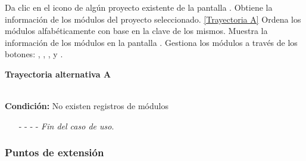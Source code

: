 \begin{UCtrayectoria}
	\UCpaso[\UCactor] Da clic en el icono  de algún proyecto existente de la pantalla .
	\UCpaso[\UCsist] Obtiene la información de los módulos del proyecto seleccionado. \hyperlink{CU5:TAA}{[Trayectoria A]}
	\UCpaso[\UCsist] Ordena los módulos alfabéticamente con base en la clave de los mismos.
	\UCpaso[\UCsist] Muestra la información de los módulos en la pantalla .\label{CU5-P3}
	\UCpaso[\UCactor] Gestiona los módulos a través de los botones: , \editar, \eliminar, \UCsist  y .
\end{UCtrayectoria}		
\hypertarget{CU5:TAA}{\textbf{Trayectoria alternativa A}}\\
\noindent \textbf{Condición:} No existen registros de módulos
\begin{enumerate}
	\UCpaso[\UCsist] Muestra el mensaje  en la pantalla  para indicar que no hay registros de módulos para mostrar. \label{CU5-TA1}
	\UCpaso[\UCactor] Gestiona los módulos a través del botón: . 
	\item[- -] - - {\em {Fin del caso de uso}}.%
\end{enumerate}

\subsubsection{Puntos de extensión}

